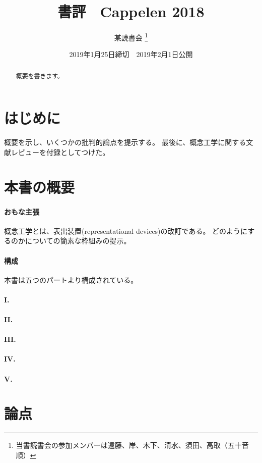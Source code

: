 \documentclass[dvipdfmx,autodetect-engine]{jsarticle}
\title{書評　Cappelen 2018 }
\author{某読書会
\footnote{当書読書会の参加メンバーは遠藤、岸、木下、清水、須田、高取（五十音順）}
}
\date{2019年1月25日締切　2019年2月1日公開}
\begin{document}
\maketitle

\begin{abstract}
概要を書きます。
\cite{Cappelen2018a}
\end{abstract}

\section{はじめに}
概要を示し、いくつかの批判的論点を提示する。
最後に、概念工学に関する文献レビューを付録としてつけた。

\section{本書の概要}
\paragraph{おもな主張}
概念工学とは、表出装置(representational devices)の改訂である。
どのようにするのかについての簡素な枠組みの提示。

\paragraph{構成}
本書は五つのパートより構成されている。

\paragraph{I. }

\paragraph{II. }

\paragraph{III. }

\paragraph{IV. }

\paragraph{V. }

\section{論点}
\end{document}

